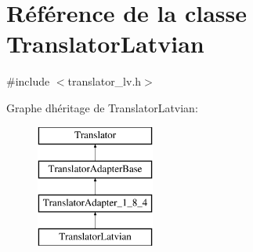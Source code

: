 \hypertarget{class_translator_latvian}{}\section{Référence de la classe Translator\+Latvian}
\label{class_translator_latvian}


{\ttfamily \#include $<$translator\+\_\+lv.\+h$>$}

Graphe d\textquotesingle{}héritage de Translator\+Latvian\+:\begin{figure}[H]
\begin{center}
\leavevmode
\includegraphics[height=4.000000cm]{class_translator_latvian}
\end{center}
\end{figure}
